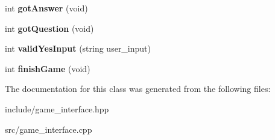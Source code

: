 \begin{DoxyCompactItemize}
\item 
int {\bfseries got\+Answer} (void)\hypertarget{classGameInterface_a0a7e8e6ca668c755e8ccc94ff091dd5b}{}\label{classGameInterface_a0a7e8e6ca668c755e8ccc94ff091dd5b}

\item 
int {\bfseries got\+Question} (void)\hypertarget{classGameInterface_afb911f0c555e8c3ba0f4be8974a49a58}{}\label{classGameInterface_afb911f0c555e8c3ba0f4be8974a49a58}

\item 
int {\bfseries valid\+Yes\+Input} (string user\+\_\+input)\hypertarget{classGameInterface_a1a06b1226a86254b6540ec08d0745009}{}\label{classGameInterface_a1a06b1226a86254b6540ec08d0745009}

\item 
int {\bfseries finish\+Game} (void)\hypertarget{classGameInterface_a7899bb55a3697443174908d0893eeb7a}{}\label{classGameInterface_a7899bb55a3697443174908d0893eeb7a}

\end{DoxyCompactItemize}


The documentation for this class was generated from the following files\+:\begin{DoxyCompactItemize}
\item 
include/game\+\_\+interface.\+hpp\item 
src/game\+\_\+interface.\+cpp\end{DoxyCompactItemize}
